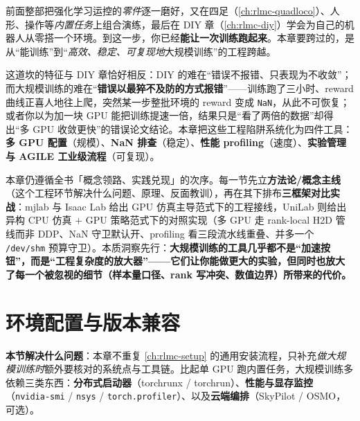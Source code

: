 前面整部把强化学习运控的\emph{零件}逐一磨好，又在四足（\cref{ch:rlmc-quadloco}）、人形、操作等\emph{内置任务}上组合演练，最后在 DIY 章（\cref{ch:rlmc-diy}）学会为自己的机器人从零搭一个环境。到这一步，你已经\textbf{能让一次训练跑起来}。本章要跨过的，是从“能训练”到“\emph{高效、稳定、可复现地}大规模训练”的工程跨越。

这道坎的特征与 DIY 章恰好相反：DIY 的难在“错误不报错、只表现为不收敛”；而大规模训练的难在“\textbf{错误以最猝不及防的方式报错}”——训练跑了三小时、reward 曲线正喜人地往上爬，突然某一步整批环境的 reward 变成 \texttt{NaN}，从此不可恢复；或者你以为加一块 GPU 能把训练提速一倍，结果只是“看了两倍的数据”却得出“多 GPU 收敛更快”的错误论文结论。本章把这些工程陷阱系统化为四件工具：\textbf{多 GPU 配置}（规模）、\textbf{NaN 排查}（稳定）、\textbf{性能 profiling}（速度）、\textbf{实验管理与 AGILE 工业级流程}（可复现）。

本章仍遵循全书「概念领路、实践兑现」的次序。每一节先立\textbf{方法论/概念主线}（这个工程环节解决什么问题、原理、反面教训），再在其下排布\textbf{三框架对比实战}：mjlab 与 Isaac Lab 给出 GPU 仿真主导范式下的工程接线，UniLab 则给出异构 CPU 仿真 $+$ GPU 策略范式下的对照实现（多 GPU 走 rank-local H2D 管线而非 DDP、NaN 守卫默认开、profiling 看三段流水线重叠、并多一个 \verb|/dev/shm| 预算守卫）。本质洞察先行：\textbf{大规模训练的工具几乎都不是“加速按钮”，而是“工程复杂度的放大器”——它们让你能做更大的实验，但同时也放大了每一个被忽视的细节（样本量口径、rank 写冲突、数值边界）所带来的代价。}

\section{环境配置与版本兼容}
\label{sec:rlmc-ls-setup}

\textbf{本节解决什么问题}：本章不重复 \cref{ch:rlmc-setup} 的通用安装流程，只补充\emph{做大规模训练时}额外要核对的系统点与工具链。比起单 GPU 跑内置任务，大规模训练多依赖三类东西：\textbf{分布式启动器}（torchrunx / torchrun）、\textbf{性能与显存监控}（\texttt{nvidia-smi} / \texttt{nsys} / \texttt{torch.profiler}）、以及\textbf{云端编排}（SkyPilot / OSMO，可选）。

